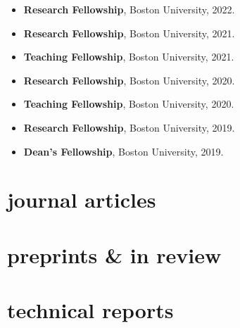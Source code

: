 \documentclass[10pt,oneside]{article}
\begin{document}
\mbox{}\vspace{-\dimexpr\baselineskip\relax}

\begin{itemize}[label={}]

  \item \textbf{Research Fellowship}, Boston University, 2022.

  \item \textbf{Research Fellowship}, Boston University, 2021.

  \item \textbf{Teaching Fellowship}, Boston University, 2021.

  \item \textbf{Research Fellowship}, Boston University, 2020.

  \item \textbf{Teaching Fellowship}, Boston University, 2020.

  \item \textbf{Research Fellowship}, Boston University, 2019.

  \item \textbf{Dean's Fellowship}, Boston University, 2019.

\end{itemize}


\section{journal articles}

\mbox{}\vspace{-\dimexpr\baselineskip\relax}
\vspace*{-1em}

\uspunctuation

\printbibliography[type=article, heading=none]

\section{preprints \& in review}

\mbox{}\vspace{-\dimexpr\baselineskip\relax}
\vspace*{-1em}
\printbibliography[type=unpublished, heading=none]

\section{technical reports}
\end{document}
